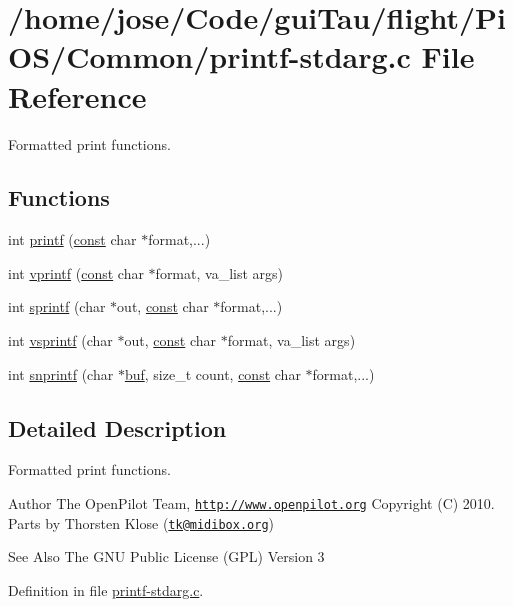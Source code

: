 \hypertarget{printf-stdarg_8c}{\section{/home/jose/\-Code/gui\-Tau/flight/\-Pi\-O\-S/\-Common/printf-\/stdarg.c File Reference}
\label{printf-stdarg_8c}
}


Formatted print functions.  


\subsection*{Functions}
\begin{DoxyCompactItemize}
\item 
int \hyperlink{group___p_i_o_s_ga98631211a4a8aee62f572375d5b637be}{printf} (\hyperlink{group___n_a_m_e_ga7ae6d0e43244213b34de2c2b9aa30da6}{const} char $\ast$format,...)
\item 
int \hyperlink{group___p_i_o_s_gaae4ab8b56862ed0a04505cafb8a05112}{vprintf} (\hyperlink{group___n_a_m_e_ga7ae6d0e43244213b34de2c2b9aa30da6}{const} char $\ast$format, va\-\_\-list args)
\item 
int \hyperlink{group___p_i_o_s_gaa0649118bc3728b2a62af0b47606ff51}{sprintf} (char $\ast$out, \hyperlink{group___n_a_m_e_ga7ae6d0e43244213b34de2c2b9aa30da6}{const} char $\ast$format,...)
\item 
int \hyperlink{group___p_i_o_s_ga7408e892dd48c6ce39b5821d917a3dd2}{vsprintf} (char $\ast$out, \hyperlink{group___n_a_m_e_ga7ae6d0e43244213b34de2c2b9aa30da6}{const} char $\ast$format, va\-\_\-list args)
\item 
int \hyperlink{group___p_i_o_s_gaf78a52a59a43dc156963dbbab958a468}{snprintf} (char $\ast$\hyperlink{mavlink__helpers_8h_af5c51bef7cca88bcb22f0517fdb06153}{buf}, size\-\_\-t count, \hyperlink{group___n_a_m_e_ga7ae6d0e43244213b34de2c2b9aa30da6}{const} char $\ast$format,...)
\end{DoxyCompactItemize}


\subsection{Detailed Description}
Formatted print functions. \begin{DoxyAuthor}{Author}
The Open\-Pilot Team, \href{http://www.openpilot.org}{\tt http\-://www.\-openpilot.\-org} Copyright (C) 2010. Parts by Thorsten Klose (\href{mailto:tk@midibox.org}{\tt tk@midibox.\-org}) 
\end{DoxyAuthor}
\begin{DoxySeeAlso}{See Also}
The G\-N\-U Public License (G\-P\-L) Version 3 
\end{DoxySeeAlso}


Definition in file \hyperlink{printf-stdarg_8c_source}{printf-\/stdarg.\-c}.

